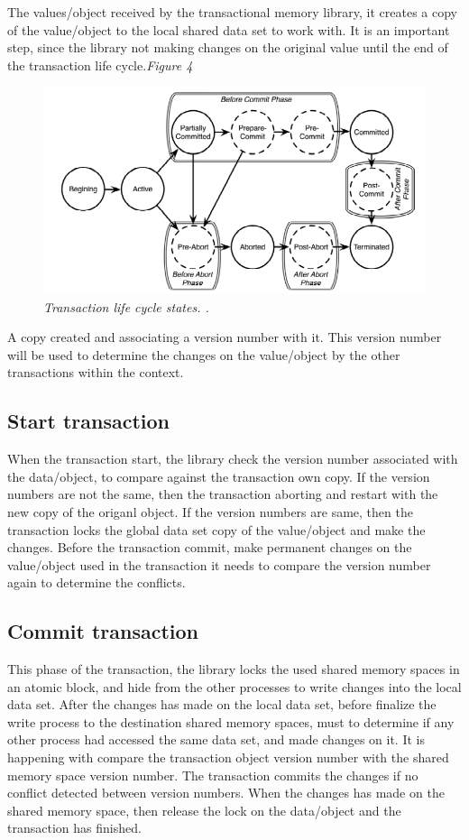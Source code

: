 \documentclass[12pt]{article}
\begin{document}
The values/object received by the transactional memory library, it creates a copy of the value/object to the local shared data set to work with. It is an important step, since the library not making changes on the original value until the end of the transaction life cycle.\textit{\color{gray}Figure 4}

\begin{figure}[h!]
\centering
\includegraphics[scale=0.4]{Pictures/transactionLifeCycle.png}
\caption{\textit{\color{gray}Transaction life cycle states. \cite{DLUATM}.}}
\end{figure}

A copy created and associating a version number with it. This version number will be used to determine the changes on the value/object by the other transactions within the context.

\subsection{Start transaction}
When the transaction start, the library check the version number associated with the data/object, to compare against the transaction own copy. If the version numbers are not the same, then the transaction aborting and restart with the new copy of the origanl object. If the version numbers are same, then the transaction locks the global data set copy of the value/object and make the changes. Before the transaction commit, make permanent changes on the value/object used in the transaction it needs to compare the version number again to determine the conflicts.   

\subsection{Commit transaction}
This phase of the transaction, the library locks the used shared memory spaces in an atomic block, and hide from the other processes to write changes into the local data set. After the changes has made on the local data set, before finalize the write process to the destination shared memory spaces, must to determine if any other process had accessed the same data set, and made changes on it. It is happening with compare the transaction object version number with the shared memory space version number. The transaction commits the changes if no conflict detected between version numbers. When the changes has made on the shared memory space, then release the lock on the data/object and the transaction has finished.\\ 
\end{document}
